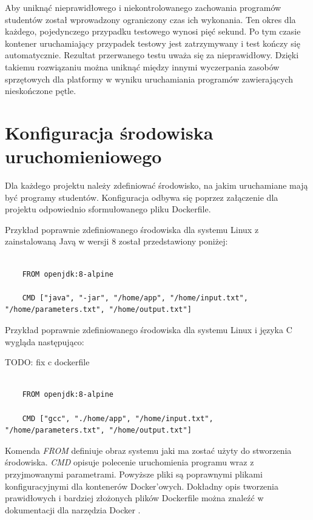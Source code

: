 Aby uniknąć nieprawidłowego i niekontrolowanego zachowania programów studentów został wprowadzony ograniczony czas ich wykonania.
Ten okres dla każdego, pojedynczego przypadku testowego wynosi pięć sekund.
Po tym czasie kontener uruchamiający przypadek testowy jest zatrzymywany i test kończy się automatycznie.
Rezultat przerwanego testu uważa się za nieprawidłowy.
Dzięki takiemu rozwiązaniu można uniknąć między innymi wyczerpania zasobów sprzętowych dla platformy w wyniku uruchamiania programów zawierających nieskończone pętle.


\section {Konfiguracja środowiska uruchomieniowego}
\label{environment_configuration}

Dla każdego projektu należy zdefiniować środowisko, na jakim uruchamiane mają być programy studentów.
Konfiguracja odbywa się poprzez załączenie dla projektu odpowiednio sformułowanego pliku Dockerfile.

Przykład poprawnie zdefiniowanego środowiska dla systemu Linux z zainstalowaną Javą w wersji 8 został przedstawiony poniżej:

{\selectfont
\tiny
\begin{lstlisting}

    FROM openjdk:8-alpine

    CMD ["java", "-jar", "/home/app", "/home/input.txt", "/home/parameters.txt", "/home/output.txt"]

\end{lstlisting}
}

Przykład poprawnie zdefiniowanego środowiska dla systemu Linux i języka C wygląda następująco:

TODO: fix c dockerfile
{\selectfont
\tiny
\begin{lstlisting}

    FROM openjdk:8-alpine

    CMD ["gcc", "./home/app", "/home/input.txt", "/home/parameters.txt", "/home/output.txt"]

\end{lstlisting}
}

Komenda \textit{FROM} definiuje obraz systemu jaki ma zostać użyty do stworzenia środowiska.
\textit{CMD} opisuje polecenie uruchomienia programu wraz z przyjmowanymi parametrami.
Powyższe pliki są poprawnymi plikami konfiguracyjnymi dla kontenerów Docker'owych.
Dokładny opis tworzenia prawidłowych i bardziej złożonych plików Dockerfile można znaleźć w dokumentacji dla narzędzia Docker \cite{docker-config}.

